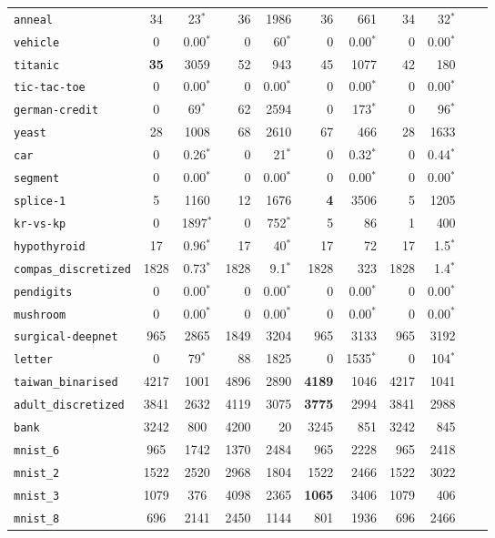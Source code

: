 \begin{tabular}{lccrrrrrrrr}
\texttt{anneal} & 34 & 23$^*$ & 36 & 1986 & 36 & 661 & 34 & 32$^*$\\
\texttt{vehicle} & 0 & 0.00$^*$ & 0 & 60$^*$ & 0 & 0.00$^*$ & 0 & 0.00$^*$\\
\texttt{titanic} & \textbf{35} & 3059 & 52 & 943 & 45 & 1077 & 42 & 180\\
\texttt{tic-tac-toe} & 0 & 0.00$^*$ & 0 & 0.00$^*$ & 0 & 0.00$^*$ & 0 & 0.00$^*$\\
\texttt{german-credit} & 0 & 69$^*$ & 62 & 2594 & 0 & 173$^*$ & 0 & 96$^*$\\
\texttt{yeast} & 28 & 1008 & 68 & 2610 & 67 & 466 & 28 & 1633\\
\texttt{car} & 0 & 0.26$^*$ & 0 & 21$^*$ & 0 & 0.32$^*$ & 0 & 0.44$^*$\\
\texttt{segment} & 0 & 0.00$^*$ & 0 & 0.00$^*$ & 0 & 0.00$^*$ & 0 & 0.00$^*$\\
\texttt{splice-1} & 5 & 1160 & 12 & 1676 & \textbf{4} & 3506 & 5 & 1205\\
\texttt{kr-vs-kp} & 0 & 1897$^*$ & 0 & 752$^*$ & 5 & 86 & 1 & 400\\
\texttt{hypothyroid} & 17 & 0.96$^*$ & 17 & 40$^*$ & 17 & 72 & 17 & 1.5$^*$\\
\texttt{compas\_discretized} & 1828 & 0.73$^*$ & 1828 & 9.1$^*$ & 1828 & 323 & 1828 & 1.4$^*$\\
\texttt{pendigits} & 0 & 0.00$^*$ & 0 & 0.00$^*$ & 0 & 0.00$^*$ & 0 & 0.00$^*$\\
\texttt{mushroom} & 0 & 0.00$^*$ & 0 & 0.00$^*$ & 0 & 0.00$^*$ & 0 & 0.00$^*$\\
\texttt{surgical-deepnet} & 965 & 2865 & 1849 & 3204 & 965 & 3133 & 965 & 3192\\
\texttt{letter} & 0 & 79$^*$ & 88 & 1825 & 0 & 1535$^*$ & 0 & 104$^*$\\
\texttt{taiwan\_binarised} & 4217 & 1001 & 4896 & 2890 & \textbf{4189} & 1046 & 4217 & 1041\\
\texttt{adult\_discretized} & 3841 & 2632 & 4119 & 3075 & \textbf{3775} & 2994 & 3841 & 2988\\
\texttt{bank} & 3242 & 800 & 4200 & 20 & 3245 & 851 & 3242 & 845\\
\texttt{mnist\_6} & 965 & 1742 & 1370 & 2484 & 965 & 2228 & 965 & 2418\\
\texttt{mnist\_2} & 1522 & 2520 & 2968 & 1804 & 1522 & 2466 & 1522 & 3022\\
\texttt{mnist\_3} & 1079 & 376 & 4098 & 2365 & \textbf{1065} & 3406 & 1079 & 406\\
\texttt{mnist\_8} & 696 & 2141 & 2450 & 1144 & 801 & 1936 & 696 & 2466\\

\end{tabular}
